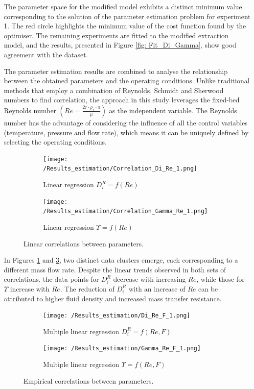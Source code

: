 \documentclass[a4paper,fleqn]{cas-dc}
\begin{document}
The parameter space for the modified model exhibits a distinct minimum value corresponding to the solution of the parameter estimation problem for experiment 1. The red circle highlights the minimum value of the cost function found by the optimiser. The remaining experiments are fitted to the modified extraction model, and the results, presented in Figure \ref{fig: Fit_Di_Gamma}, show good agreement with the dataset. 

The parameter estimation results are combined to analyse the relationship between the obtained parameters and the operating conditions. Unlike traditional methods that employ a combination of Reynolds, Schmidt and Sherwood numbers to find correlation, the approach in this study leverages the fixed-bed Reynolds number $\left(Re = \frac{2r \cdot \rho_f \cdot u}{\mu}\right)$ as the independent variable. The Reynolds number has the advantage of considering the influence of all the control variables (temperature, pressure and flow rate), which means it can be uniquely defined by selecting the operating conditions.	

\begin{figure}[!h]
	\centering
	\begin{subfigure}{0.9\columnwidth}
		\centering
		\texttt{[image: /Results\_estimation/Correlation\_Di\_Re\_1.png]}
		\caption{Linear regression $D_i^R = f(Re)$}
		\label{fig: Correlations_Di_Re}
	\end{subfigure}
	\hfill
	\begin{subfigure}{0.9\columnwidth}
		\centering
		\texttt{[image: /Results\_estimation/Correlation\_Gamma\_Re\_1.png]}
		\caption{Linear regression $\Upsilon = f(Re)$}
		\label{fig: Correlations_Gamma_Re}
	\end{subfigure}
	\caption{Linear correlations between parameters.}
\end{figure}

In Figures \ref{fig: Correlations_Di_Re} and \ref{fig: Correlations_Gamma_Re}, two distinct data clusters emerge, each corresponding to a different mass flow rate. Despite the linear trends observed in both sets of correlations, the data points for $D_i^R$ decrease with increasing $Re$, while those for $\Upsilon$ increase with $Re$. The reduction of $D_i^R$ with an increase of $Re$ can be attributed to higher fluid density and increased mass transfer resistance.

\begin{figure}[!h]
	\centering
	\begin{subfigure}{0.9\columnwidth}
		\centering
		\texttt{[image: /Results\_estimation/Di\_Re\_F\_1.png]}
		\caption{Multiple linear regression $D_i^R = f(Re, F)$}
		\label{fig: Correlations_Di_Re_F}
	\end{subfigure}
	\hfill
	\begin{subfigure}{0.9\columnwidth}
		\centering
		\texttt{[image: /Results\_estimation/Gamma\_Re\_F\_1.png]}
		\caption{Multiple linear regression $\Upsilon = f(Re, F)$}
		\label{fig: Correlations_Gamma_Re_F}
	\end{subfigure}
	\caption{Empirical correlations between parameters.}
\end{figure}
\end{document}
